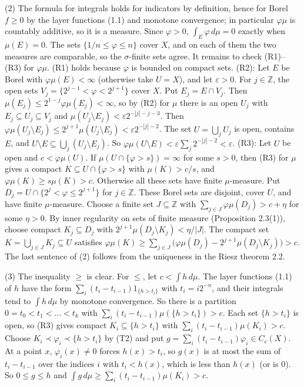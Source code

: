 \documentclass[
  english,
  11pt,
  a4paper,
]{article}
\begin{document}
(2) The formula for integrals holds for indicators by definition, hence
for Borel \(f\geq0\) by the layer functions (1.1) and monotone
convergence; in particular \(\varphi\mu\) is countably additive, so it
is a measure. Since \(\varphi>0\), \(\int_E\varphi\,d\mu=0\) exactly
when \(\mu(E)=0\). The sets \(\{1/n\leq\varphi\leq n\}\) cover \(X\),
and on each of them the two measures are comparable, so the
\(\sigma\)-finite sets agree. It remains to check (R1)--(R3) for
\(\varphi\mu\). (R1) holds because \(\varphi\) is bounded on compact
sets. (R2): Let \(E\) be Borel with \(\varphi\mu(E)<\infty\) (otherwise
take \(U=X\)), and let \(\varepsilon>0\). For \(j\in\mathbb Z\), the
open sets \(V_j=\{2^{j-1}<\varphi<2^{j+1}\}\) cover \(X\). Put
\(E_j=E\cap V_j\). Then \(\mu(E_j)\leq2^{1-j}\varphi\mu(E_j)<\infty\),
so by (R2) for \(\mu\) there is an open \(U_j\) with
\(E_j\subseteq U_j\subseteq V_j\) and
\(\mu(U_j\setminus E_j)<\varepsilon2^{-|j|-j-3}\). Then
\(\varphi\mu(U_j\setminus E_j)\leq2^{j+1}\mu(U_j\setminus E_j)<\varepsilon2^{-|j|-2}\).
The set \(U=\bigcup_jU_j\) is open, contains \(E\), and
\(U\setminus E\subseteq\bigcup_j(U_j\setminus E_j)\). So
\(\varphi\mu(U\setminus E)<\varepsilon\sum_j2^{-|j|-2}<\varepsilon\).
(R3): Let \(U\) be open and \(c<\varphi\mu(U)\). If
\(\mu(U\cap\{\varphi>s\})=\infty\) for some \(s>0\), then (R3) for
\(\mu\) gives a compact \(K\subseteq U\cap\{\varphi>s\}\) with
\(\mu(K)>c/s\), and \(\varphi\mu(K)\geq s\mu(K)>c\). Otherwise all these
sets have finite \(\mu\)-measure. Put
\(D_j=U\cap\{2^j<\varphi\leq2^{j+1}\}\) for \(j\in\mathbb Z\). These
Borel sets are disjoint, cover \(U\), and have finite \(\mu\)-measure.
Choose a finite set \(J\subseteq\mathbb Z\) with
\(\sum_{j\in J}\varphi\mu(D_j)>c+\eta\) for some \(\eta>0\). By inner
regularity on sets of finite measure (Proposition 2.3(1)), choose
compact \(K_j\subseteq D_j\) with
\(2^{j+1}\mu(D_j\setminus K_j)<\eta/|J|\). The compact set
\(K=\bigcup_{j\in J}K_j\subseteq U\) satisfies
\(\varphi\mu(K)\geq\sum_{j\in J}\big(\varphi\mu(D_j)-2^{j+1}\mu(D_j\setminus K_j)\big)>c\).
The last sentence of (2) follows from the uniqueness in the Riesz
theorem 2.2.

(3) The inequality \(\geq\) is clear. For \(\leq\), let
\(c<\int h\,d\mu\). The layer functions (1.1) of \(h\) have the form
\(\sum_i(t_i-t_{i-1})1_{\{h>t_i\}}\) with \(t_i=i2^{-n}\), and their
integrals tend to \(\int h\,d\mu\) by monotone convergence. So there is
a partition \(0=t_0<t_1<\dots<t_k\) with
\(\sum_i(t_i-t_{i-1})\mu(\{h>t_i\})>c\). Each set \(\{h>t_i\}\) is open,
so (R3) gives compact \(K_i\subseteq\{h>t_i\}\) with
\(\sum_i(t_i-t_{i-1})\mu(K_i)>c\). Choose
\(K_i\prec\varphi_i\prec\{h>t_i\}\) by (T2) and put
\(g=\sum_i(t_i-t_{i-1})\varphi_i\in C_c(X)\). At a point \(x\),
\(\varphi_i(x)\neq0\) forces \(h(x)>t_i\), so \(g(x)\) is at most the
sum of \(t_i-t_{i-1}\) over the indices \(i\) with \(t_i<h(x)\), which
is less than \(h(x)\) (or is \(0\)). So \(0\leq g\leq h\) and
\(\int g\,d\mu\geq\sum_i(t_i-t_{i-1})\mu(K_i)>c\).
\end{document}
